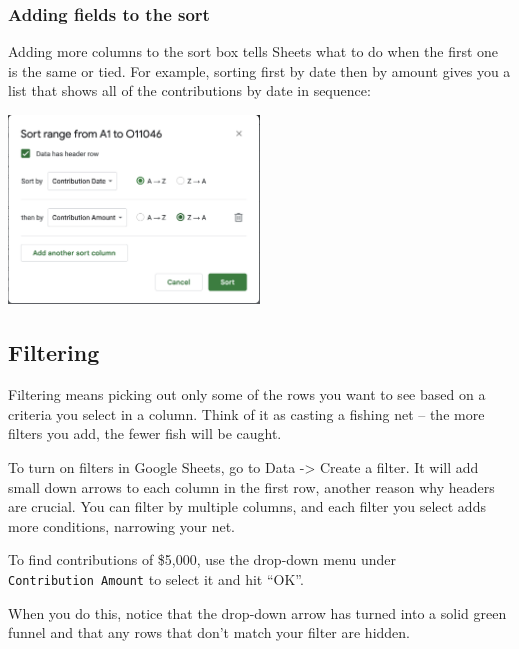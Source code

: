 \documentclass[
  letterpaper,
  DIV=11,
  numbers=noendperiod]{scrreprt}
\begin{document}
\hypertarget{adding-fields-to-the-sort}{%
\subsubsection*{Adding fields to the
sort}\label{adding-fields-to-the-sort}}

Adding more columns to the sort box tells Sheets what to do when the
first one is the same or tied. For example, sorting first by date then
by amount gives you a list that shows all of the contributions by date
in sequence:

\includegraphics[width=0.5\textwidth,height=\textheight]{./images/sheets-filter-sort-date.png}

\hypertarget{filtering}{%
\subsection{Filtering}\label{filtering}}

Filtering means picking out only some of the rows you want to see based
on a criteria you select in a column. Think of it as casting a fishing
net -- the more filters you add, the fewer fish will be caught.

To turn on filters in Google Sheets, go to Data -\textgreater{} Create a
filter. It will add small down arrows to each column in the first row,
another reason why headers are crucial. You can filter by multiple
columns, and each filter you select adds more conditions, narrowing your
net.

To find contributions of \$5,000, use the drop-down menu under
\texttt{Contribution\ Amount} to select it and hit ``OK''.

When you do this, notice that the drop-down arrow has turned into a
solid green funnel and that any rows that don't match your filter are
hidden.
\end{document}
